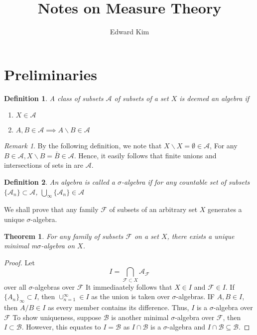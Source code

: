 \documentclass[12pt]{article}
\title{Notes on Measure Theory}
\author{Edward Kim}
\newtheorem{theorem}{Theorem}[section]
\newtheorem{definition}{Definition}[section]
\theoremstyle{remark}
\newtheorem{remark}{Remark}
\begin{document}
\maketitle
\clearpage

\section{Preliminaries}
\begin{definition}
A class of subsets $\mathcal{A}$ of subsets of a set $X$ is deemed an algebra if
	\begin{enumerate}
	\item $X \in \mathcal{A}$
	\item $A,B \in \mathcal{A} \implies A \backslash B \in \mathcal{A}$  
	\end{enumerate}
\end{definition}

\begin{remark}
By the following definition, we note that $X\backslash X = \emptyset \in \mathcal{A}$, For any $B \in \mathcal{A}, X \backslash B = \bar{B} \in \mathcal{A}$. Hence, it easily follows that finite unions and intersections of sets in are $\mathcal{A}$.  
\end{remark}

\begin{definition}
An algebra is called a $\sigma$-algebra if for any countable set of subsets $\{\mathcal{A}_n\} \subset \mathcal{A}$, $\bigcup_{\infty} \{\mathcal{A}_n\} \in \mathcal{A}$
\end{definition}

We shall prove that any family $\mathcal{F}$ of subsets of an arbitrary set $X$ generates a unique $\sigma$-algebra.

\begin{theorem}
For any family of subsets $\mathcal{F}$ on a set $X$, there exists a unique minimal m$\sigma$-algebra on $X$.
\end{theorem}

\begin{proof}

Let $$ I = \bigcap_{ \mathcal{F} \subset X} \mathcal{A}_{\mathcal{F}} $$
over all $\sigma$-algebras over $\mathcal{F}$
It immediaately follows that $X \in I$ and $\mathcal{F} \in I$. If $\{A_n\}_{\infty} \subset I$, then $\cup_{n=1}^{\infty} \in I$ as the union is taken over $\sigma$-algebras. IF $A,B \in I$, then $A/B \in I$ as every member contains its difference. Thus, $I$ is a $\sigma$-algebra over $\mathcal{F}$
To show uniqueness, suppose $\mathcal{B}$ is another minimal $\sigma$-algebra over $\mathcal{F}$, then $I \subset \mathcal{B}$. However, this equates to $I = \mathcal{B}$ as $I \cap \mathcal{B}$ is a $\sigma$-algebra and $I \cap \mathcal{B} \subseteq \mathcal{B}$. 
  
\end{proof}
\end{document}
